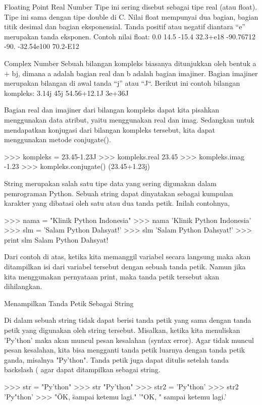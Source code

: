\begin{enumerate}
Floating Point Real Number
Tipe ini sering disebut sebagai tipe real (atau float). Tipe ini sama dengan tipe double di C. Nilai float mempunyai dua bagian, bagian titik desimal dan bagian eksponensial. Tanda positif atau negatif diantara “e” merupakan tanda eksponen. Contoh nilai float:
0.0 14.5 -15.4 32.3+e18
-90.76712 -90. -32.54e100 70.2-E12

Complex Number
Sebuah bilangan kompleks biasanya ditunjukkan oleh bentuk a + bj, dimana a adalah bagian real dan b adalah bagian imajiner. Bagian imajiner merupakan bilangan di awal tanda “j” atau “J“. Berikut ini contoh bilangan kompleks:
3.14j 45j 54.56+12.1J 3e+36J

Bagian real dan imajiner dari bilangan kompleks dapat kita pisahkan menggunakan data atribut, yaitu menggunakan real dan imag. Sedangkan untuk mendapatkan konjugasi dari bilangan kompleks tersebut, kita dapat menggunakan metode conjugate().

>>> kompleks = 23.45-1.23J
>>> kompleks.real
23.45
>>> kompleks.imag
-1.23
>>> kompleks.conjugate()
(23.45+1.23j)

String merupakan salah satu tipe data yang sering digunakan dalam pemrograman Python. Sebuah string dapat dinyatakan sebagai kumpulan karakter yang dibatasi oleh satu atau dua tanda petik. Inilah contohnya,

>>> nama = "Klinik Python Indonesia"
>>> nama
'Klinik Python Indonesia'
>>> slm = 'Salam Python Dahsyat!'
>>> slm
'Salam Python Dahsyat!'
>>> print slm
Salam Python Dahsyat!

Dari contoh di atas, ketika kita memanggil variabel secara langsung maka akan ditampilkan isi dari variabel tersebut dengan sebuah tanda petik. Namun jika kita menggunakan pernyataan print, maka tanda petik tersebut akan dihilangkan.

Menampilkan Tanda Petik Sebagai String

Di dalam sebuah string tidak dapat berisi tanda petik yang sama dengan tanda petik yang digunakan oleh string tersebut. Misalkan, ketika kita menuliskan 'Py'thon' maka akan muncul pesan kesalahan (syntax error). Agar tidak muncul pesan kesalahan, kita bisa mengganti tanda petik luarnya dengan tanda petik ganda, misalnya "Py'thon". Tanda petik juga dapat ditulis setelah tanda backslash (\) agar dapat ditampilkan sebagai string.

>>> str = "Py'thon"
>>> str
"Py'thon"
>>> str2 = 'Py"thon'
>>> str2
'Py"thon'
>>> "\"OK, \" sampai ketemu lagi."
'"OK, " sampai ketemu lagi.'


\end{enumerate}

